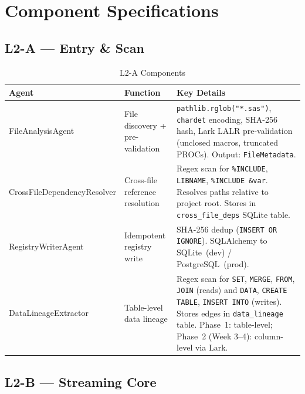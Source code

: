 \documentclass[11pt,a4paper]{article}
\begin{document}
\section{Component Specifications}

\subsection{L2-A — Entry \& Scan}

\begin{table}[H]
\centering
\caption{L2-A Components}
\renewcommand{\arraystretch}{1.3}
\small
\begin{tabularx}{\textwidth}{@{} l L{3.5cm} X @{}}
\toprule
\textbf{Agent} & \textbf{Function} & \textbf{Key Details} \\
\midrule
FileAnalysisAgent & File discovery + pre-validation & \texttt{pathlib.rglob("*.sas")}, \texttt{chardet} encoding, SHA-256 hash, Lark LALR pre-validation (unclosed macros, truncated PROCs). Output: \texttt{FileMetadata}. \\
\addlinespace
CrossFileDependencyResolver & Cross-file reference resolution & Regex scan for \texttt{\%INCLUDE}, \texttt{LIBNAME}, \texttt{\%INCLUDE \&var}. Resolves paths relative to project root. Stores in \texttt{cross\_file\_deps} SQLite table. \\
\addlinespace
RegistryWriterAgent & Idempotent registry write & SHA-256 dedup (\texttt{INSERT OR IGNORE}). SQLAlchemy to SQLite~(dev) / PostgreSQL~(prod). \\
\addlinespace
DataLineageExtractor & Table-level data lineage & Regex scan for \texttt{SET}, \texttt{MERGE}, \texttt{FROM}, \texttt{JOIN} (reads) and \texttt{DATA}, \texttt{CREATE TABLE}, \texttt{INSERT INTO} (writes). Stores edges in \texttt{data\_lineage} table. Phase~1: table-level; Phase~2 (Week 3--4): column-level via Lark. \\
\bottomrule
\end{tabularx}
\end{table}

\subsection{L2-B — Streaming Core}
\end{document}
